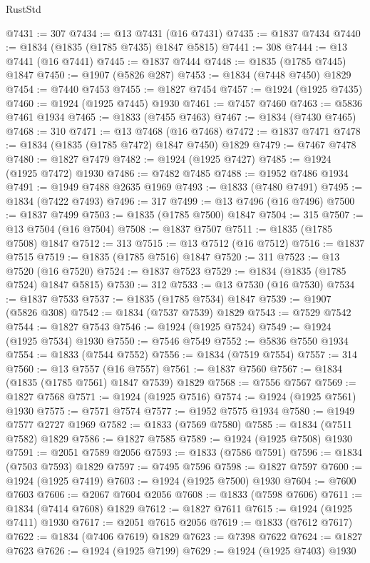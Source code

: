 \begin{lexlean}{RustStd}
\begin{coremodule}
{\begin{coremodule}
{{{{{@7431 := 307
@7434 := @13 @7431 (@16 @7431)
@7435 := @1837 @7434
@7440 := @1834 (@1835 (@1785 @7435) @1847 @5815)
@7441 := 308
@7444 := @13 @7441 (@16 @7441)
@7445 := @1837 @7444
@7448 := @1835 (@1785 @7445) @1847
@7450 := @1907 (@5826 @287)
@7453 := @1834 (@7448 @7450) @1829
@7454 := @7440 @7453
@7455 := @1827 @7454
@7457 := @1924 (@1925 @7435)
@7460 := @1924 (@1925 @7445) @1930
@7461 := @7457 @7460
@7463 := @5836 @7461 @1934
@7465 := @1833 (@7455 @7463)
@7467 := @1834 (@7430 @7465)
@7468 := 310
@7471 := @13 @7468 (@16 @7468)
@7472 := @1837 @7471
@7478 := @1834 (@1835 (@1785 @7472) @1847 @7450) @1829
@7479 := @7467 @7478
@7480 := @1827 @7479
@7482 := @1924 (@1925 @7427)
@7485 := @1924 (@1925 @7472) @1930
@7486 := @7482 @7485
@7488 := @1952 @7486 @1934
@7491 := @1949 @7488 @2635 @1969
@7493 := @1833 (@7480 @7491)
@7495 := @1834 (@7422 @7493)
@7496 := 317
@7499 := @13 @7496 (@16 @7496)
@7500 := @1837 @7499
@7503 := @1835 (@1785 @7500) @1847
@7504 := 315
@7507 := @13 @7504 (@16 @7504)
@7508 := @1837 @7507
@7511 := @1835 (@1785 @7508) @1847
@7512 := 313
@7515 := @13 @7512 (@16 @7512)
@7516 := @1837 @7515
@7519 := @1835 (@1785 @7516) @1847
@7520 := 311
@7523 := @13 @7520 (@16 @7520)
@7524 := @1837 @7523
@7529 := @1834 (@1835 (@1785 @7524) @1847 @5815)
@7530 := 312
@7533 := @13 @7530 (@16 @7530)
@7534 := @1837 @7533
@7537 := @1835 (@1785 @7534) @1847
@7539 := @1907 (@5826 @308)
@7542 := @1834 (@7537 @7539) @1829
@7543 := @7529 @7542
@7544 := @1827 @7543
@7546 := @1924 (@1925 @7524)
@7549 := @1924 (@1925 @7534) @1930
@7550 := @7546 @7549
@7552 := @5836 @7550 @1934
@7554 := @1833 (@7544 @7552)
@7556 := @1834 (@7519 @7554)
@7557 := 314
@7560 := @13 @7557 (@16 @7557)
@7561 := @1837 @7560
@7567 := @1834 (@1835 (@1785 @7561) @1847 @7539) @1829
@7568 := @7556 @7567
@7569 := @1827 @7568
@7571 := @1924 (@1925 @7516)
@7574 := @1924 (@1925 @7561) @1930
@7575 := @7571 @7574
@7577 := @1952 @7575 @1934
@7580 := @1949 @7577 @2727 @1969
@7582 := @1833 (@7569 @7580)
@7585 := @1834 (@7511 @7582) @1829
@7586 := @1827 @7585
@7589 := @1924 (@1925 @7508) @1930
@7591 := @2051 @7589 @2056
@7593 := @1833 (@7586 @7591)
@7596 := @1834 (@7503 @7593) @1829
@7597 := @7495 @7596
@7598 := @1827 @7597
@7600 := @1924 (@1925 @7419)
@7603 := @1924 (@1925 @7500) @1930
@7604 := @7600 @7603
@7606 := @2067 @7604 @2056
@7608 := @1833 (@7598 @7606)
@7611 := @1834 (@7414 @7608) @1829
@7612 := @1827 @7611
@7615 := @1924 (@1925 @7411) @1930
@7617 := @2051 @7615 @2056
@7619 := @1833 (@7612 @7617)
@7622 := @1834 (@7406 @7619) @1829
@7623 := @7398 @7622
@7624 := @1827 @7623
@7626 := @1924 (@1925 @7199)
@7629 := @1924 (@1925 @7403) @1930
}}}}}
\end{coremodule}}
\end{coremodule}
\end{lexlean}

